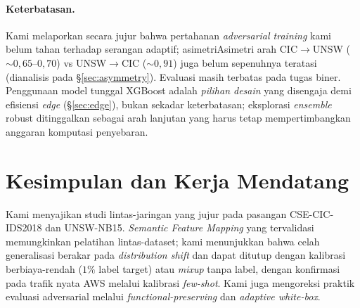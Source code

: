 \documentclass[11pt,a4paper]{article}
\begin{document}
\paragraph{Keterbatasan.} \ifadversarial Kami melaporkan secara jujur bahwa pertahanan
\emph{adversarial training} kami belum tahan terhadap serangan adaptif; asimetri\else Asimetri\fi
arah CIC$\rightarrow$UNSW ($\sim 0{,}65$--$0{,}70$) vs UNSW$\rightarrow$CIC
($\sim 0{,}91$) \ifadversarial juga \fi belum sepenuhnya teratasi (dianalisis pada
\S\ref{sec:asymmetry}). Evaluasi masih terbatas pada tugas biner. Penggunaan
model tunggal XGBoost adalah \emph{pilihan desain} yang disengaja demi efisiensi
\emph{edge} (\S\ref{sec:edge}), bukan sekadar keterbatasan; eksplorasi
\emph{ensemble} robust ditinggalkan sebagai arah lanjutan yang harus tetap
mempertimbangkan anggaran komputasi penyebaran.

\section{Kesimpulan dan Kerja Mendatang}
\label{sec:conclusion}

Kami menyajikan studi lintas-jaringan yang jujur pada pasangan CSE-CIC-IDS2018
dan UNSW-NB15. \emph{Semantic Feature Mapping} yang tervalidasi memungkinkan
pelatihan lintas-dataset; kami menunjukkan bahwa celah generalisasi berakar pada
\emph{distribution shift} dan dapat ditutup dengan kalibrasi berbiaya-rendah
($1\%$ label target) atau \emph{mixup} tanpa label, dengan konfirmasi pada
trafik nyata AWS melalui kalibrasi \emph{few-shot}.\ifadversarial{} Kami juga mengoreksi praktik
evaluasi adversarial melalui \emph{functional-preserving} dan
\emph{adaptive white-box}.\fi
\end{document}
